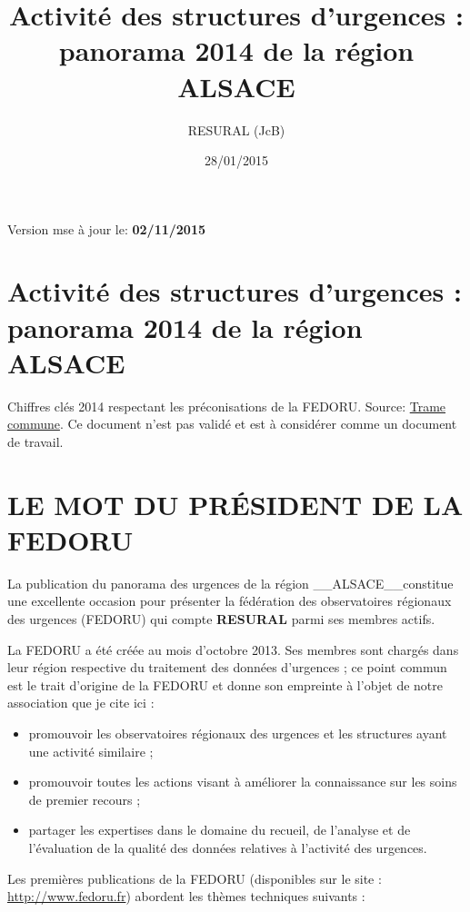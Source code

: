 \documentclass[]{article}
\title{Activité des structures d'urgences : panorama 2014 de la région ALSACE}
\author{RESURAL (JcB)}
\date{28/01/2015}
\begin{document}
\maketitle


{
\hypersetup{linkcolor=black}
\setcounter{tocdepth}{3}
\tableofcontents
}
Version mse à jour le: \textbf{02/11/2015}

\section{Activité des structures d'urgences : panorama 2014 de la région
ALSACE}\label{activite-des-structures-durgences-panorama-2014-de-la-region-alsace}

Chiffres clés 2014 respectant les préconisations de la FEDORU. Source:
\href{https://docs.google.com/document/d/101LYVqVLeHZnrujfMm3aqBYfbOwx3CPEB3Y-Lbud2Ls/edit}{Trame
commune}. Ce document n'est pas validé et est à considérer comme un
document de travail.

\section{LE MOT DU PRÉSIDENT DE LA
FEDORU}\label{le-mot-du-president-de-la-fedoru}

La publication du panorama des urgences de la région
\_\_ALSACE\_\_constitue une excellente occasion pour présenter la
fédération des observatoires régionaux des urgences (FEDORU) qui compte
\textbf{RESURAL} parmi ses membres actifs.

La FEDORU a été créée au mois d'octobre 2013. Ses membres sont chargés
dans leur région respective du traitement des données d'urgences ; ce
point commun est le trait d'origine de la FEDORU et donne son empreinte
à l'objet de notre association que je cite ici :

\begin{itemize}
\itemsep1pt\parskip0pt
\item
  promouvoir les observatoires régionaux des urgences et les structures
  ayant une activité similaire ;
\item
  promouvoir toutes les actions visant à améliorer la connaissance sur
  les soins de premier recours ;
\item
  partager les expertises dans le domaine du recueil, de l'analyse et de
  l'évaluation de la qualité des données relatives à l'activité des
  urgences.
\end{itemize}

Les premières publications de la FEDORU (disponibles sur le site :
\url{http://www.fedoru.fr}) abordent les thèmes techniques suivants :
\end{document}
